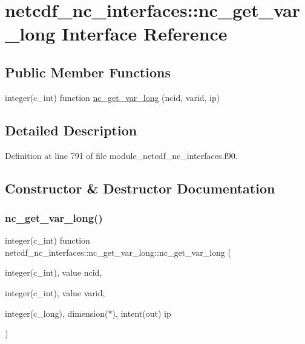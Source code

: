 \hypertarget{interfacenetcdf__nc__interfaces_1_1nc__get__var__long}{}\section{netcdf\+\_\+nc\+\_\+interfaces\+:\+:nc\+\_\+get\+\_\+var\+\_\+long Interface Reference}
\label{interfacenetcdf__nc__interfaces_1_1nc__get__var__long}
\subsection*{Public Member Functions}
\begin{DoxyCompactItemize}
\item 
integer(c\+\_\+int) function \hyperlink{interfacenetcdf__nc__interfaces_1_1nc__get__var__long_a888e0935059493ddff786994bc1b6789}{nc\+\_\+get\+\_\+var\+\_\+long} (ncid, varid, ip)
\end{DoxyCompactItemize}


\subsection{Detailed Description}


Definition at line 791 of file module\+\_\+netcdf\+\_\+nc\+\_\+interfaces.\+f90.



\subsection{Constructor \& Destructor Documentation}
\mbox{\label{interfacenetcdf__nc__interfaces_1_1nc__get__var__long_a888e0935059493ddff786994bc1b6789}} 
\subsubsection{\texorpdfstring{nc\+\_\+get\+\_\+var\+\_\+long()}{nc\_get\_var\_long()}}
{\footnotesize\ttfamily integer(c\+\_\+int) function netcdf\+\_\+nc\+\_\+interfaces\+::nc\+\_\+get\+\_\+var\+\_\+long\+::nc\+\_\+get\+\_\+var\+\_\+long (\begin{DoxyParamCaption}\item[{integer(c\+\_\+int), value}]{ncid,  }\item[{integer(c\+\_\+int), value}]{varid,  }\item[{integer(c\+\_\+long), dimension($\ast$), intent(out)}]{ip }\end{DoxyParamCaption})}



